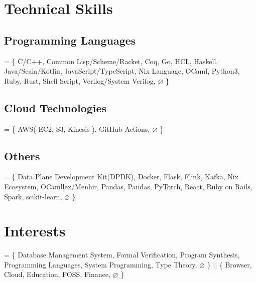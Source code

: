 \documentclass[10pt]{article}
\begin{document}
\section*{Technical Skills}
  \subsection*{Programming Languages}
    = \{
      C/C++,
      Common Lisp/Scheme/Racket,
      Coq,
      Go,
      HCL,
      Haskell,
      Java/Scala/Kotlin,
      JavaScript/TypeScript,
      Nix Language,
      OCaml,
      Python3,
      Ruby,
      Rust,
      Shell Script,
      Verilog/System Verilog,
      $\varnothing$
    \}
  \subsection*{Cloud Technologies}
    = \{
      AWS(
        EC2,
        S3,
        Kinesis
      ),
      GitHub Actions,
      $\varnothing$
    \}
  \subsection*{Others}
    = \{
      Data Plane Development Kit(DPDK),
      Docker,
      Flask,
      Flink,
      Kafka,
      Nix Ecosystem,
      OCamllex/Menhir,
      Pandas,
      Pandas,
      PyTorch,
      React,
      Ruby on Rails,
      Spark,
      scikit-learn,
      $\varnothing$
    \}

\section*{Interests}
  = \{
    Database Management System,
    Formal Verification,
    Program Synthesis,
    Programming Languages,
    System Programming,
    Type Theory,
    $\varnothing$
  \}
  ||
  \{
    Browser,
    Cloud,
    Education,
    FOSS,
    Finance,
    $\varnothing$
  \}
\end{document}
